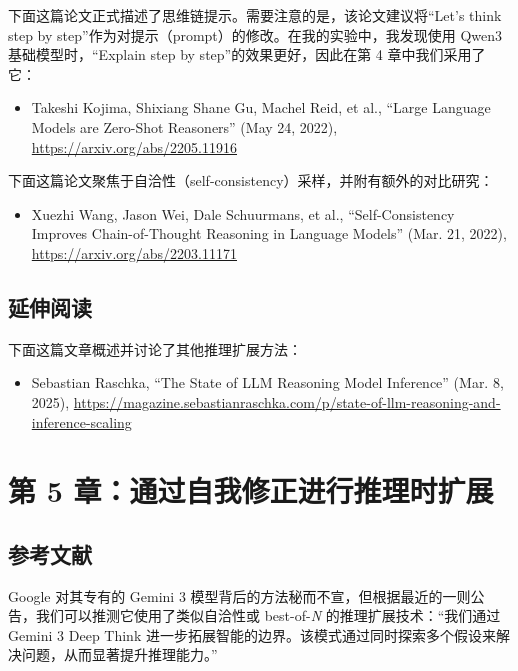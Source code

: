 下面这篇论文正式描述了思维链提示。需要注意的是，该论文建议将“Let's think step by step”作为对提示（prompt）的修改。在我的实验中，我发现使用 Qwen3 基础模型时，“Explain step by step”的效果更好，因此在第 4 章中我们采用了它：

\begin{itemize}
\item Takeshi Kojima, Shixiang Shane Gu, Machel Reid, et al., “Large Language Models are Zero-Shot Reasoners” (May 24, 2022), \href{https://arxiv.org/abs/2205.11916}{https://arxiv.org/abs/2205.11916}
\end{itemize}

下面这篇论文聚焦于自洽性（self-consistency）采样，并附有额外的对比研究：

\begin{itemize}
\item Xuezhi Wang, Jason Wei, Dale Schuurmans, et al., “Self-Consistency Improves Chain-of-Thought Reasoning in Language Models” (Mar. 21, 2022), \href{https://arxiv.org/abs/2203.11171}{https://arxiv.org/abs/2203.11171}
\end{itemize}

\subsection{延伸阅读}

下面这篇文章概述并讨论了其他推理扩展方法：

\begin{itemize}
\item Sebastian Raschka, “The State of LLM Reasoning Model Inference” (Mar. 8, 2025), \href{https://magazine.sebastianraschka.com/p/state-of-llm-reasoning-and-inference-scaling}{https://magazine.sebastianraschka.com/p/state-of-llm-reasoning-and-inference-scaling}
\end{itemize}

\section{第 5 章：通过自我修正进行推理时扩展}

\subsection{参考文献}

Google 对其专有的 Gemini 3 模型背后的方法秘而不宣，但根据最近的一则公告，我们可以推测它使用了类似自洽性或 best-of-\emph{N} 的推理扩展技术：“我们通过 Gemini 3 Deep Think 进一步拓展智能的边界。该模式通过同时探索多个假设来解决问题，从而显著提升推理能力。”

